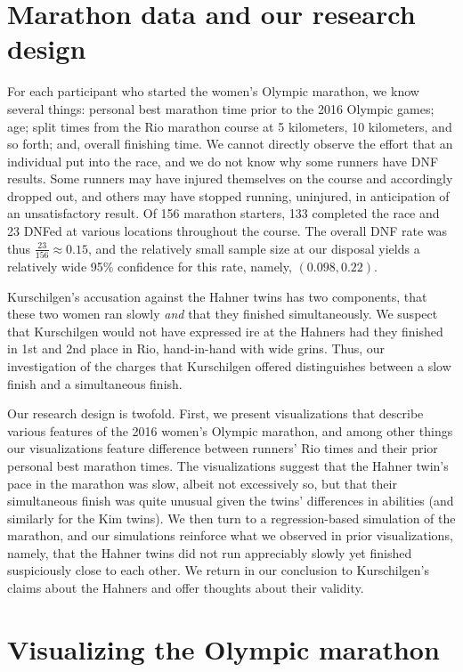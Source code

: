 \documentclass[12pt,titlepage]{article}
\begin{document}
\section*{Marathon data and our research design}

For each participant who started the women's Olympic marathon, we know
several things: personal best marathon time prior to the 2016 Olympic
games; age; split times from the Rio marathon course at 5 kilometers,
10 kilometers, and so forth; and, overall finishing time. We cannot
directly observe the effort that an individual put into the race, and
we do not know why some runners have DNF results.  Some runners may
have injured themselves on the course and accordingly dropped out, and
others may have stopped running, uninjured, in anticipation of an
unsatisfactory result. Of 156 marathon starters, 133 completed the
race and 23 DNFed at various locations throughout the course. The
overall DNF rate was thus $\frac{23}{156} \approx 0.15$, and the
relatively small sample size at our disposal yields a relatively wide
95\% confidence for this rate, namely, $\left(0.098, 0.22\right)$.

Kurschilgen's accusation against the Hahner twins has two components,
that these two women ran slowly \emph{and} that they finished
simultaneously.  We suspect that Kurschilgen would not have expressed
ire at the Hahners had they finished in 1st and 2nd place in Rio,
hand-in-hand with wide grins.  Thus, our investigation of the charges
that Kurschilgen offered distinguishes between a slow finish and a
simultaneous finish.

Our research design is twofold.  First, we present visualizations that
describe various features of the 2016 women's Olympic marathon, and
among other things our visualizations feature difference between
runners' Rio times and their prior personal best marathon times.  The
visualizations suggest that the Hahner twin's pace in the marathon was
slow, albeit not excessively so, but that their simultaneous finish
was quite unusual given the twins' differences in abilities (and
similarly for the Kim twins).  We then turn to a regression-based
simulation of the marathon, and our simulations reinforce what we
observed in prior visualizations, namely, that the Hahner twins did
not run appreciably slowly yet finished suspiciously close to each
other.  We return in our conclusion to Kurschilgen's claims about the
Hahners and offer thoughts about their validity.

\section*{Visualizing the Olympic marathon}
\end{document}
